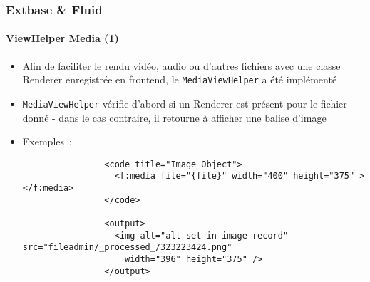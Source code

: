 \begin{frame}[fragile]
	\frametitle{Extbase \& Fluid}
	\framesubtitle{ViewHelper Media (1)}

	\lstset{basicstyle=\tiny\ttfamily}

	\begin{itemize}

		\item Afin de faciliter le rendu vidéo, audio ou d'autres fichiers avec
			une classe Renderer enregistrée en frontend, le \texttt{MediaViewHelper}
			a été implémenté

		\item \texttt{MediaViewHelper} vérifie d'abord si un Renderer est présent pour
			le fichier donné - dans le cas contraire, il retourne à afficher une balise d'image

		\item Exemples~:

			\begin{lstlisting}
				<code title="Image Object">
				  <f:media file="{file}" width="400" height="375" ></f:media>
				</code>

				<output>
				  <img alt="alt set in image record" src="fileadmin/_processed_/323223424.png"
				    width="396" height="375" />
				</output>
			\end{lstlisting}

	\end{itemize}

\end{frame}


